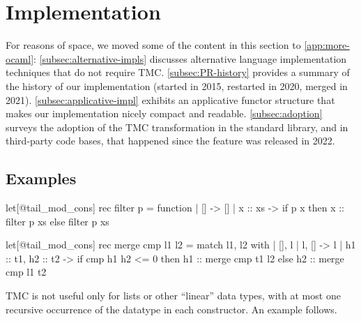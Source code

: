 \section{\OCaml Implementation}
\label{sec:implementation}

For reasons of space, we moved some of the content in this section to \cref{app:more-ocaml}:
%
\cref{subsec:alternative-impls}
  discusses alternative language implementation techniques that do not require TMC.
%
\cref{subsec:PR-history} provides a summary of the history of our implementation (started in 2015, restarted in 2020, merged in 2021).
%
\cref{subsec:applicative-impl} exhibits an applicative functor structure that makes our implementation nicely compact and readable.
%
\cref{subsec:adoption} surveys the adoption of the TMC transformation in the standard library,
  and in third-party \OCaml code bases, that happened since the feature was released in 2022.

\subsection{Examples}
\label{subsec:ocaml-examples}


\begin{minipage}{0.47\linewidth}
\begin{Ocaml}
let[@tail_mod_cons] rec filter p =
  function
  | [] -> []
  | x :: xs ->
    if p x
    then x :: filter p xs
    else filter p xs
\end{Ocaml}
\end{minipage}
\hfill
\begin{minipage}{0.53\linewidth}
\begin{Ocaml}
let[@tail_mod_cons] rec merge cmp l1 l2 =
  match l1, l2 with
  | [], l | l, [] -> l
  | h1 :: t1, h2 :: t2 ->
      if cmp h1 h2 <= 0
      then h1 :: merge cmp t1 l2
      else h2 :: merge cmp l1 t2
\end{Ocaml}
\end{minipage}

TMC is not useful only for lists or other ``linear'' data types, with
at most one recursive occurrence of the datatype in each
constructor. An example follows.


